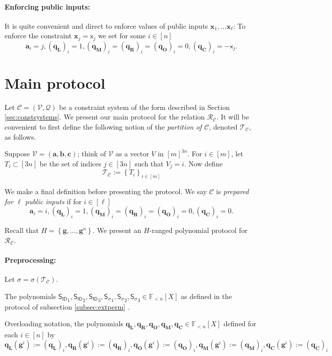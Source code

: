\documentclass[11pt]{article} %
\newcommand{\F}{\ensuremath{\mathbb F}\xspace}
\newcommand{\sigof}[1]{\ensuremath{\sigma(#1)}\xspace}
\newcommand{\defeq}{:=}
\newcommand{\dom}{\ensuremath{H}\xspace}
\newcommand{\partition}{\ensuremath{{\mathcal T}}\xspace}
\newcommand{\partof}[1]{\ensuremath{{\partition_{#1}}}\xspace}
\newcommand{\sett}[2]{\ensuremath{\set{#1}_{#2}}\xspace}
\newcommand{\inp}{\ensuremath{\mathsf{x}}\xspace}
\newcommand{\rel}{\ensuremath{\mathcal{R}}\xspace}
\newcommand{\set}[1]{\ensuremath{\left\{#1\right\}}\xspace}
\newcommand{\hgen}{\ensuremath{\mathbf{g}}\xspace}
\newcommand{\polysofdeg}[1]{\ensuremath{\F_{< #1}[X]}\xspace}
\newcommand{\sigpoly}{\ensuremath{\mathsf{S_{\sigma}}}\xspace}
\newcommand{\idpoly}{\ensuremath{\mathsf{S_{ID}}}\xspace}
\newcommand{\selleft}{\ensuremath{\mathbf{q_L}}\xspace}
\newcommand{\selright}{\ensuremath{\mathbf{q_R}}\xspace}
\newcommand{\selout}{\ensuremath{\mathbf{q_O}}\xspace}
\newcommand{\selmult}{\ensuremath{\mathbf{q_M}}\xspace}
\newcommand{\selconst}{\ensuremath{\mathbf{q_C}}\xspace}
\newcommand{\selectors}{\ensuremath{\mathcal{Q}}\xspace}
\newcommand{\lvar}{\ensuremath{\mathbf{a}}\xspace}
\newcommand{\vars}{\ensuremath{\mathcal{V}}\xspace}
\newcommand{\rvar}{\ensuremath{\mathbf{b}}\xspace}
\newcommand{\ovar}{\ensuremath{\mathbf{c}}\xspace}
\newcommand{\assignment}{\ensuremath{\mathbf{x}}\xspace}
\newcommand{\constsystem}{\ensuremath{\mathscr{C}}\xspace}
\newcommand{\relof}[1]{\ensuremath{\rel_{#1}}\xspace}
\begin{document}
\paragraph{Enforcing public inputs:}
It is quite convenient and direct to enforce values of public inputs $\assignment_1,\ldots\assignment_\ell$: To enforce the constraint $\assignment_j = \inp_j$ we set  for some $i\in [n]$
\[\lvar_i=j,    (\selleft)_i=1 ,(\selmult)_i= (\selright)_i=(\selout)_i = 0 , (\selconst)_i =-\inp_j.\]  





\section{Main protocol}
Let $\constsystem=(\vars,\selectors)$ be a constraint system of the form described in Section \ref{sec:constsystems}.
We present our main protocol for the relation \relof{\constsystem}.
It will be convenient to first define the following notion of the \emph{partition of \constsystem}, denoted $\partof{\constsystem}$, as follows.

Suppose $\vars=(\lvar,\rvar,\ovar)$; think of \vars as a vector $V$ in $[m]^{3n}$.
For $i\in [m]$, let $T_i\subset [3n]$ be the set of indices $j\in [3n]$ such that $V_j=i$.
Now define 
\[\partof{\constsystem}\defeq \sett{T_i}{i\in [m]}\]


We make a final definition before presenting the protocol.
We say \constsystem is \emph{prepared for $\ell$ public inputs} if for $i\in [\ell]$ 
\[\lvar_i=i,    (\selleft)_i=1 ,(\selmult)_i= (\selright)_i=(\selout)_i = 0 , (\selconst)_i =0.\]  

Recall that $\dom=\set{\hgen,\ldots,\hgen^n}$.
We present an \dom-ranged polynomial protocol for \relof{\constsystem}.

\paragraph{Preprocessing:}
Let $\sigma = \sigof{\partof{\constsystem}}$.

The polynomials $\idpoly_1,\idpoly_2,\idpoly_3, \sigpoly_1,\sigpoly_2,\sigpoly_3\in \polysofdeg{n}$ as defined in the protocol of subsection \ref{subsec:extperm} .

Overloading notation, the polynomials $\selleft,\selright,\selout,\selmult,\selconst\in \polysofdeg{n}$ defined for each $i\in [n]$ by
\[\selleft(\hgen^i)\defeq(\selleft)_i,\selright(\hgen^i)\defeq (\selright)_i,\selout(\hgen^i)\defeq (\selout)_i,\selmult(\hgen^i)\defeq (\selmult)_i,\selconst(\hgen^i)\defeq (\selconst)_i\]
\end{document}
